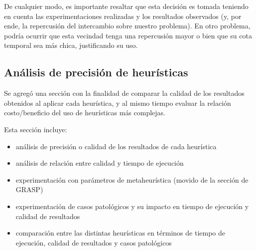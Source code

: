 		
		De cualquier modo, es importante resaltar que esta decisión es tomada teniendo en cuenta las experimentaciones realizadas y los resultados observados (y, por ende, la repercusión del intercambio sobre nuestro problema). En otro problema, podría ocurrir que esta vecindad tenga una repercusión mayor o bien que su cota temporal sea más chica, justificando su uso.
		
	\subsection*{Análisis de precisión de heurísticas}

		Se agregó una sección con la finalidad de comparar la calidad de los resultados obtenidos al aplicar cada heurística, y al mismo tiempo evaluar la relación costo/beneficio del uso de heurísticas más complejas.

		Esta sección incluye:

		\begin{itemize}
			\item análisis de precisión o calidad de los resultados de cada heurística

			\item análisis de relación entre calidad y tiempo de ejecución

			\item experimentación con parámetros de metaheurística (movido de la sección de GRASP)

			\item experimentación de casos patológicos y su impacto en tiempo de ejecución y calidad de resultados

			\item comparación entre las distintas heurísticas en términos de tiempo de ejecución, calidad de resultados y casos patológicos
		\end{itemize}
